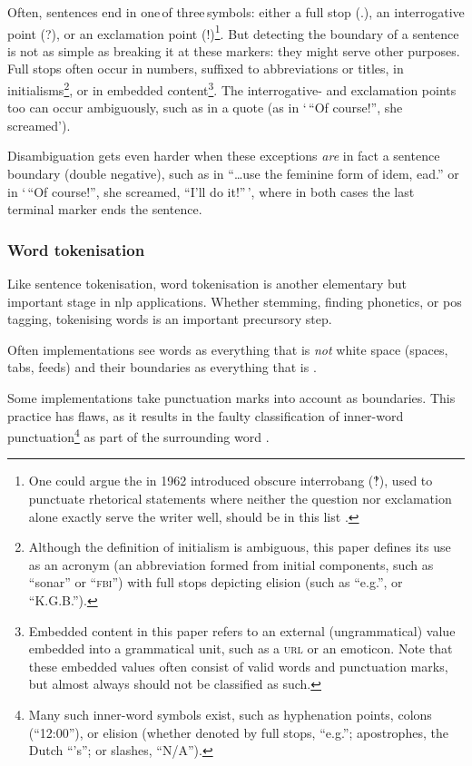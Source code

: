 Often, sentences end in one\,of three\,symbols: either a full stop (.),
  an interrogative point (?), or an exclamation point (!)\footnote{One
    could argue the in 1962 introduced
    obscure interrobang (‽), used to punctuate rhetorical statements where
    neither the question nor exclamation alone exactly serve the writer
    well, should be in this list \autocite{interrobang-mks.com}.}.
But detecting the boundary of a sentence is not as simple as breaking it at
  these markers: they might serve other purposes.
Full stops often occur in numbers, suffixed to abbreviations or titles,
  in initialisms\footnote{Although
    the definition of initialism is ambiguous, this paper defines its use
    as an acronym (an abbreviation formed from initial components, such as
    ``sonar'' or ``\textsc{fbi}'') with full stops depicting elision (such as
    ``e.g.'', or ``K.G.B.'').},
  or in embedded content\footnote{Embedded
    content in this paper refers to an external (ungrammatical) value
    embedded into a grammatical unit, such as a \textsc{url} or an emoticon.
    Note that these embedded values often consist of valid words and
    punctuation marks, but almost always should not be classified as such.}.
The interrogative- and exclamation points too can occur ambiguously, such as
  in a quote (as in `\,``Of course!'', she screamed').

Disambiguation gets even harder when these exceptions \emph{are} in fact a
  sentence boundary (double negative), such as in
  ``\ldots{}use the feminine form of idem, ead.'' or in
  `\,``Of course!'', she screamed, ``I'll do it!''\,', where in both
  cases the last terminal marker ends the sentence.

\subsubsection{Word tokenisation}\label{word-tokenisation}

Like sentence tokenisation, word tokenisation is another elementary but
important stage in \gls{nlp} applications. Whether stemming, finding
phonetics, or \gls{pos} tagging, tokenising words is an important
precursory step.

Often implementations see words as everything that is \emph{not} white
  space (spaces, tabs, feeds) and their boundaries as everything that
  is \autocite{loadfive/knwl-source-code}.

Some implementations take punctuation marks into account as boundaries.
This practice has flaws, as it results in the faulty classification of
  inner-word punctuation\footnote{Many such inner-word symbols exist, such
    as hyphenation points, colons (``12:00''), or elision (whether denoted
    by full stops, ``e.g.''; apostrophes, the Dutch ``'s''; or slashes,
    ``N/A'').}
  as part of the surrounding word \autocite{NaturalNode/natural-source-code}.

